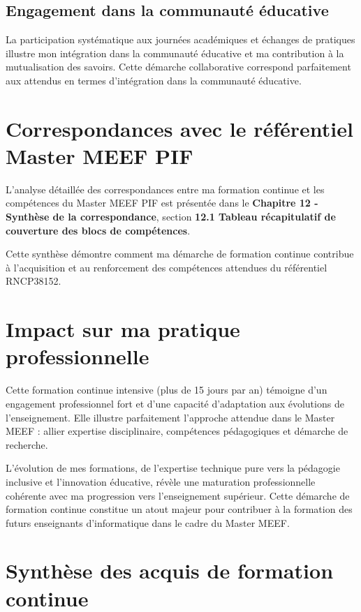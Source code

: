 \subsection{Engagement dans la communauté éducative}

La participation systématique aux journées académiques et échanges de pratiques illustre mon intégration dans la communauté éducative et ma contribution à la mutualisation des savoirs. Cette démarche collaborative correspond parfaitement aux attendus en termes d'intégration dans la communauté éducative.

\section{Correspondances avec le référentiel Master MEEF PIF}

L'analyse détaillée des correspondances entre ma formation continue et les compétences du Master MEEF PIF est présentée dans le \textbf{Chapitre 12 - Synthèse de la correspondance}, section \textbf{12.1 Tableau récapitulatif de couverture des blocs de compétences}.

Cette synthèse démontre comment ma démarche de formation continue contribue à l'acquisition et au renforcement des compétences attendues du référentiel RNCP38152.

\section{Impact sur ma pratique professionnelle}

Cette formation continue intensive (plus de 15 jours par an) témoigne d'un engagement professionnel fort et d'une capacité d'adaptation aux évolutions de l'enseignement. Elle illustre parfaitement l'approche attendue dans le Master MEEF : allier expertise disciplinaire, compétences pédagogiques et démarche de recherche.

L'évolution de mes formations, de l'expertise technique pure vers la pédagogie inclusive et l'innovation éducative, révèle une maturation professionnelle cohérente avec ma progression vers l'enseignement supérieur. Cette démarche de formation continue constitue un atout majeur pour contribuer à la formation des futurs enseignants d'informatique dans le cadre du Master MEEF.

\section{Synthèse des acquis de formation continue}

